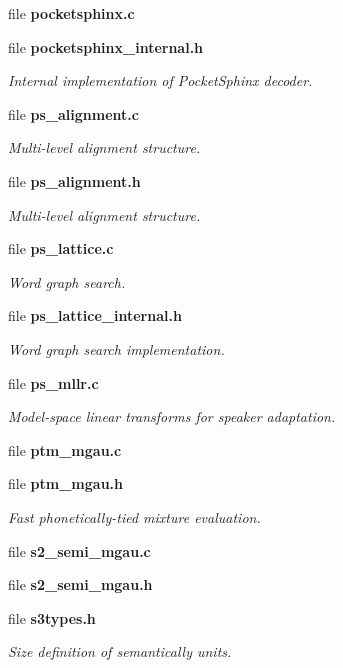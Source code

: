 \begin{DoxyCompactItemize}
file {\bfseries pocketsphinx.\-c}
\item 
file {\bf pocketsphinx\-\_\-internal.\-h}
\begin{DoxyCompactList}\small\item\em Internal implementation of Pocket\-Sphinx decoder. \end{DoxyCompactList}\item 
file {\bf ps\-\_\-alignment.\-c}
\begin{DoxyCompactList}\small\item\em Multi-\/level alignment structure. \end{DoxyCompactList}\item 
file {\bf ps\-\_\-alignment.\-h}
\begin{DoxyCompactList}\small\item\em Multi-\/level alignment structure. \end{DoxyCompactList}\item 
file {\bf ps\-\_\-lattice.\-c}
\begin{DoxyCompactList}\small\item\em Word graph search. \end{DoxyCompactList}\item 
file {\bf ps\-\_\-lattice\-\_\-internal.\-h}
\begin{DoxyCompactList}\small\item\em Word graph search implementation. \end{DoxyCompactList}\item 
file {\bf ps\-\_\-mllr.\-c}
\begin{DoxyCompactList}\small\item\em Model-\/space linear transforms for speaker adaptation. \end{DoxyCompactList}\item 
file {\bfseries ptm\-\_\-mgau.\-c}
\item 
file {\bf ptm\-\_\-mgau.\-h}
\begin{DoxyCompactList}\small\item\em Fast phonetically-\/tied mixture evaluation. \end{DoxyCompactList}\item 
file {\bfseries s2\-\_\-semi\-\_\-mgau.\-c}
\item 
file {\bfseries s2\-\_\-semi\-\_\-mgau.\-h}
\item 
file {\bf s3types.\-h}
\begin{DoxyCompactList}\small\item\em Size definition of semantically units. \end{DoxyCompactList}\item 

\end{DoxyCompactItemize}

